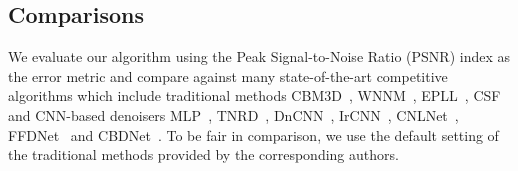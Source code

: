 \documentclass[10pt,twocolumn,letterpaper]{article}
\begin{document}
\subsection{Comparisons}
We evaluate our algorithm using the Peak Signal-to-Noise Ratio (PSNR) index as the error metric and compare against many state-of-the-art competitive algorithms which include traditional methods \ie CBM3D~\cite{dabov2007CBM3D}, WNNM~\cite{Gu2014WNN},  EPLL~\cite{Zoran2011EPLL}, CSF~\cite{schmidt2014CSF} and CNN-based denoisers \ie MLP~\cite{Burger2012MLP},  TNRD~\cite{chen2017TNRD}, DnCNN~\cite{zhang2017DnCNN}, IrCNN~\cite{zhang2017IRCNN}, CNLNet~\cite{lefkimmiatis2017NLNet}, FFDNet~\cite{zhang2018ffdnet} and CBDNet~\cite{guo2018CBDnet}. To be fair in comparison, we use the default setting of the traditional methods provided by the corresponding authors.
\end{document}
